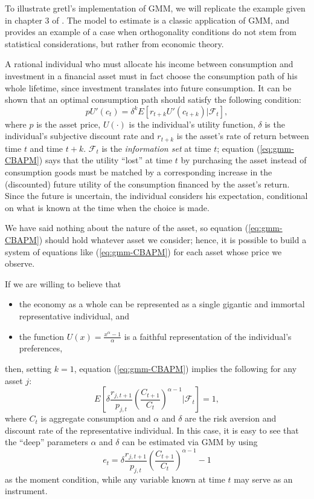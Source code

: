 To illustrate gretl's implementation of GMM, we will replicate
the example given in chapter 3 of \cite{hall05}. The model to estimate
is a classic application of GMM, and provides an example of a case
when orthogonality conditions do not stem from statistical
considerations, but rather from economic theory.

A rational individual who must allocate his income between consumption
and investment in a financial asset must in fact choose the consumption
path of his whole lifetime, since investment translates into future
consumption. It can be shown that an optimal consumption path should
satisfy the following condition:
\begin{equation}
  \label{eq:gmm-CBAPM}
  p U'(c_t) = \delta^k E\left[ r_{t+k} U'(c_{t+k}) | \mathcal{F}_t
  \right] ,
\end{equation}
where $p$ is the asset price, $U(\cdot)$ is the individual's utility
function, $\delta$ is the individual's subjective discount rate and
$r_{t+k}$ is the asset's rate of return between time $t$ and time
$t+k$. $\mathcal{F}_t$ is the \emph{information set} at time $t$;
equation (\ref{eq:gmm-CBAPM}) says that the utility ``lost'' at time
$t$ by purchasing the asset instead of consumption goods must be
matched by a corresponding increase in the (discounted) future utility
of the consumption financed by the asset's return. Since the future is
uncertain, the individual considers his expectation, conditional on
what is known at the time when the choice is made.

We have said nothing about the nature of the asset, so equation
(\ref{eq:gmm-CBAPM}) should hold whatever asset we consider; hence, it
is possible to build a system of equations like (\ref{eq:gmm-CBAPM})
for each asset whose price we observe.

If we are willing to believe that
\begin{itemize}
\item the economy as a whole can be represented as a single gigantic
  and immortal representative individual, and
\item the function $U(x) = \frac{x^{\alpha} - 1 }{\alpha}$ is a
  faithful representation of the individual's preferences,
\end{itemize}
then, setting $k=1$, equation (\ref{eq:gmm-CBAPM}) implies the
following for any asset $j$:
\begin{equation}
  \label{eq:gmm-CBAPM-est}
  E\left[ \delta \frac{r_{j,t+1}}{p_{j,t}} \left(\frac{C_{t+1}}{C_{t}}
    \right)^{\alpha - 1} \bigg| \mathcal{F}_t \right] = 1 ,
\end{equation}
where $C_t$ is aggregate consumption and $\alpha$ and $\delta$ are the
risk aversion and discount rate of the representative individual. In
this case, it is easy to see that the ``deep'' parameters $\alpha$ and
$\delta$ can be estimated via GMM by using
\[
  e_t = \delta \frac{r_{j,t+1}}{p_{j,t}} \left(\frac{C_{t+1}}{C_{t}}
    \right)^{\alpha - 1} - 1
\]
as the moment condition, while any variable known at time $t$ may serve as
an instrument.


